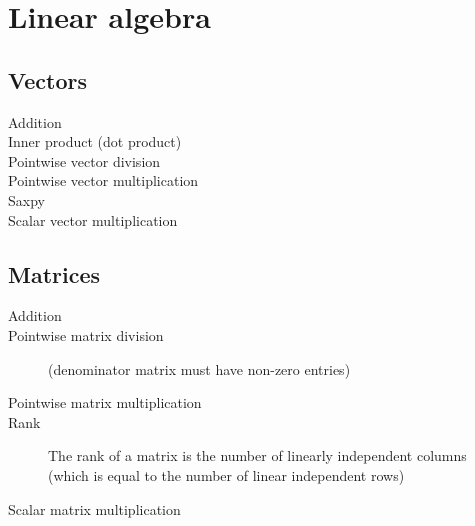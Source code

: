\chapter{Linear algebra}

\section{Vectors}
\begin{description}
    \item[Addition]
    \item[Inner product (dot product)]
    \item[Pointwise vector division]
    \item[Pointwise vector multiplication]
    \item[Saxpy]
    \item[Scalar vector multiplication]
\end{description}

\section{Matrices}
\begin{description}
    \item[Addition]
    \item[Pointwise matrix division] (denominator matrix must have non-zero entries)
    \item[Pointwise matrix multiplication]
    \item[Rank] The rank of a matrix is the number of linearly independent columns (which is equal to the number of linear independent rows)
    \item[Scalar matrix multiplication]
\end{description}
